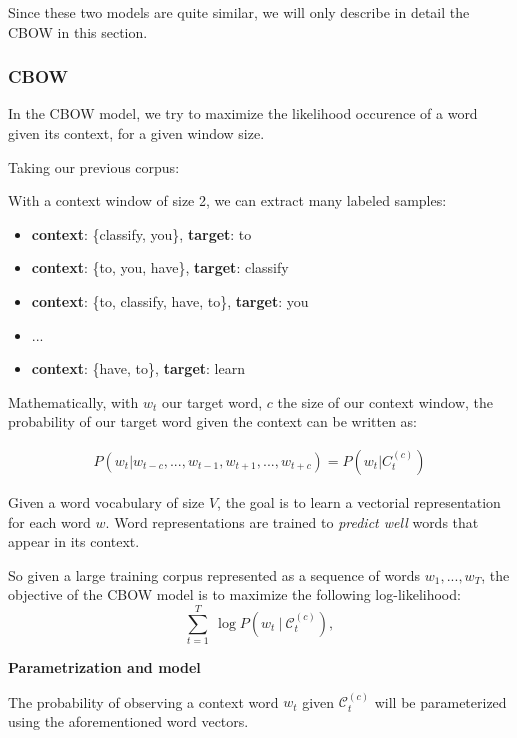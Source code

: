 Since these two models are quite similar, we will only describe in detail the CBOW in this section.

\subsubsection{CBOW}

In the CBOW model, we try to maximize the likelihood occurence of a word given its context, for a given window size.

Taking our previous corpus: 


With a context window of size 2, we can extract many labeled samples:
\begin{itemize}
	\item \textbf{context}: \{classify, you\}, \textbf{target}: to
	\item \textbf{context}: \{to, you, have\}, \textbf{target}: classify
	\item \textbf{context}: \{to, classify, have, to\}, \textbf{target}: you
	\item ...
	\item \textbf{context}: \{have, to\}, \textbf{target}: learn
\end{itemize}


Mathematically, with $w_t$ our target word, $c$ the size of our context window, the probability of our target word given the context can be written as:

\begin{align}
	P(w_t | w_{t-c}, ..., w_{t-1}, w_{t+1}, ... ,w_{t+c}) = P(w_t | C_t^{(c)})
\end{align}

Given a word vocabulary of size $V$, the goal is to learn a vectorial representation for each word $w$. Word representations are trained to \emph{predict well} words that appear in its context.

So given a large training corpus represented as a sequence of words $w_1, ..., w_T$, the objective of the CBOW model is to maximize the following log-likelihood:
\begin{equation*}
  \sum_{t=1}^T \ \log P(w_t \ | \ \mathcal{C}_t^{(c)}),
\end{equation*}

\textbf{Parametrization and model}

The probability of observing a context word $w_t$ given $\mathcal{C}_t^{(c)}$ will be parameterized using the aforementioned word vectors.

